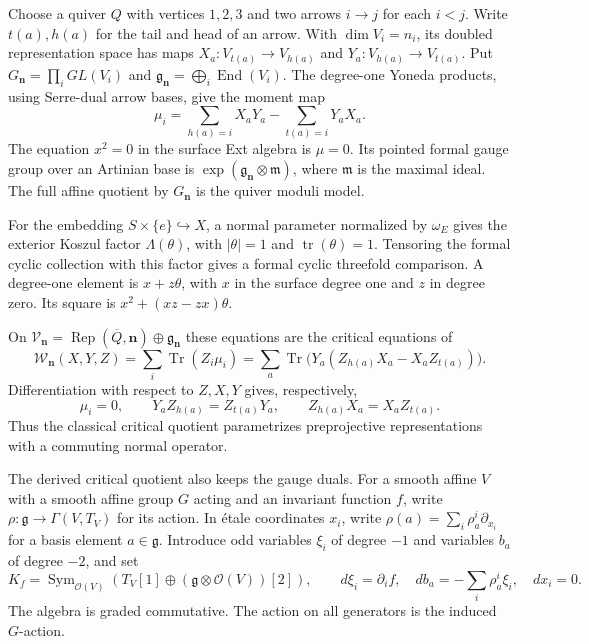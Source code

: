Choose a quiver $Q$ with vertices $1,2,3$ and two arrows
$i\to j$ for each $i<j$. Write $t(a),h(a)$ for the tail
and head of an arrow. With $\dim V_i=n_i$, its doubled representation space
has maps
$X_a:V_{t(a)}\to V_{h(a)}$ and
$Y_a:V_{h(a)}\to V_{t(a)}$.
Put $G_{\mathbf n}=\prod_iGL(V_i)$ and
$\mathfrak g_{\mathbf n}=\bigoplus_i\operatorname{End}(V_i)$.
The degree-one Yoneda products, using Serre-dual arrow
bases, give the moment map
\begin{equation}\label{cycompact:eq:moment}
 \mu_i=\sum_{h(a)=i}X_aY_a-\sum_{t(a)=i}Y_aX_a.
\end{equation}
The equation $x^2=0$ in the surface Ext algebra is
$\mu=0$. Its pointed formal gauge group over an Artinian
base is $\exp(\mathfrak g_{\mathbf n}\otimes\mathfrak m)$,
where $\mathfrak m$ is the maximal ideal. The full affine
quotient by $G_{\mathbf n}$ is the quiver moduli model.

For the embedding $S\times\{e\}\hookrightarrow X$, a
normal parameter normalized by $\omega_E$ gives the exterior Koszul factor
$\Lambda(\theta)$, with $|\theta|=1$ and
$\operatorname{tr}(\theta)=1$. Tensoring the formal cyclic
collection with this factor gives a formal cyclic
threefold comparison. A degree-one element is $x+z\theta$,
with $x$ in the surface degree one and $z$ in degree zero.
Its square is $x^2+(xz-zx)\theta$.

On
$\mathcal V_{\mathbf n}=\operatorname{Rep}(\overline Q,\mathbf n)
\oplus\mathfrak g_{\mathbf n}$ these equations are the
critical equations of
\begin{equation}\label{cycompact:eq:potential}
 \mathcal W_{\mathbf n}(X,Y,Z)
 =\sum_i\operatorname{Tr}(Z_i\mu_i)
 =\sum_a\operatorname{Tr}
       \bigl(Y_a(Z_{h(a)}X_a-X_aZ_{t(a)})\bigr).
\end{equation}
Differentiation with respect to $Z,X,Y$ gives, respectively,
\[
 \mu_i=0,\qquad
 Y_aZ_{h(a)}=Z_{t(a)}Y_a,\qquad
 Z_{h(a)}X_a=X_aZ_{t(a)}.
\]
Thus the classical critical quotient parametrizes
preprojective representations with a commuting normal
operator.

The derived critical quotient also keeps the gauge duals.
For a smooth affine $V$ with a smooth affine group $G$
acting and an invariant function $f$, write
$\rho:\mathfrak g\to\Gamma(V,T_V)$ for its action.
In \'{e}tale coordinates $x_i$, write
$\rho(a)=\sum_i\rho_a^i\partial_{x_i}$ for a basis element
$a\in\mathfrak g$. Introduce odd variables $\xi_i$
of degree $-1$ and variables $b_a$ of degree $-2$, and set
\begin{equation}\label{cycompact:eq:critical-dga}
 K_f=\operatorname{Sym}_{\mathcal O(V)}
       (T_V[1]\oplus(\mathfrak g\otimes\mathcal O(V))[2]),\qquad
 d\xi_i=\partial_if,\quad
 db_a=-\sum_i\rho_a^i\xi_i,\quad dx_i=0.
\end{equation}
The algebra is graded commutative. The action on all
generators is the induced $G$-action.

